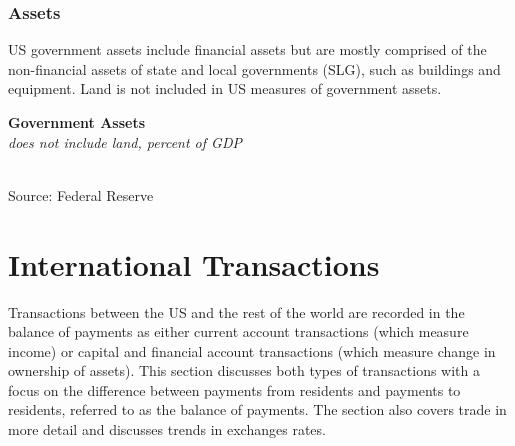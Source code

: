 \documentclass{report}
\makeatletter
\newcommand{\tbllink}[1]{\href{https://raw.githubusercontent.com/bdecon/US-chartbook/master/chartbook/data/#1}{\faTable}}
\newcommand*\short[1]{\expandafter\@gobbletwo\number\numexpr#1\relax}
\newcommand{\sbar}[4]{
		\addplot[ybar stacked, bar width=2.4pt, draw opacity=0, fill=#1] 
			table [x=#2, y=#3, col sep=comma]{#4};}
\newcommand{\dateaxisticks}{
		date coordinates in=x, axis line style={draw=none},
		xmax={2022-10-31},
		max space between ticks=40,	    
		xtick={{1990-01-01}, {1992-01-01}, {1994-01-01}, 
			{1996-01-01}, {1998-01-01}, {2000-01-01}, 
			{2002-01-01}, {2004-01-01}, {2006-01-01},
			{2008-01-01}, {2010-01-01}, {2012-01-01}, {2014-01-01},
		    {2016-01-01}, {2018-01-01}, {2020-01-01}, {2022-01-01}, 
		    {2024-01-01}, {2026-01-01}},
		minor xtick={{1989-01-01}, {1991-01-01}, {1993-01-01},
			{1995-01-01}, {1997-01-01}, {1999-01-01}, 
			{2001-01-01}, {2003-01-01}, {2005-01-01}, {2007-01-01},
		    {2009-01-01}, {2011-01-01}, {2013-01-01}, {2015-01-01},
		    {2017-01-01}, {2019-01-01}, {2021-01-01}, {2023-01-01}, 
		    {2025-01-01}, {2027-01-01}},
		enlarge y limits={0.06}, enlarge x limits={0.01},
		}
\newcommand{\bbar}[2]{extra #1 ticks = {{#2}}, extra #1 tick labels = ,
		extra #1 tick style = {grid=major, grid style={thick, black!25}},}
\newcommand{\rbars}{
		\fill[color=black!10] (axis cs:{1990-07-01},\pgfkeysvalueof{/pgfplots/ymin}) rectangle 
			(axis cs:{1991-03-01}, \pgfkeysvalueof{/pgfplots/ymax});
		\fill[color=black!10] (axis cs:{2007-12-01},\pgfkeysvalueof{/pgfplots/ymin}) rectangle 
			(axis cs:{2009-07-01}, \pgfkeysvalueof{/pgfplots/ymax});
		\fill[color=black!10] (axis cs:{2001-03-01},\pgfkeysvalueof{/pgfplots/ymin}) rectangle 
			(axis cs:{2001-11-01}, \pgfkeysvalueof{/pgfplots/ymax});
		\fill[color=black!10] (axis cs:{2020-02-01},\pgfkeysvalueof{/pgfplots/ymin}) rectangle 
			(axis cs:{2020-05-01}, \pgfkeysvalueof{/pgfplots/ymax});}
\makeatother
\begin{document}
{\begin{minipage}{0.76\textwidth}
\subsubsection*{Assets}
\small US government assets include financial assets but are mostly comprised of the non-financial assets of state and local governments (SLG), such as buildings and equipment. Land is not included in US measures of government assets. 


\vspace{2mm}

\normalsize \textbf{Government Assets}\\
\footnotesize{\textit{does not include land, percent of GDP}}\\
\hspace*{-2mm} \\
\footnotesize{Source: Federal Reserve} \hfill \tbllink{govassets.csv}
\end{minipage}
\newpage
\hypertarget{ext}{}
\section*{International Transactions}
\begin{minipage}{0.76\textwidth}
\small Transactions between the US and the rest of the world are recorded in the balance of payments as either current account transactions (which measure income) or capital and financial account transactions (which measure change in ownership of assets). This section discusses both types of transactions with a focus on the difference between payments from residents and payments to residents, referred to as the balance of payments. The section also covers trade in more detail and discusses trends in exchanges rates. 


\end{minipage}}
\end{document}
